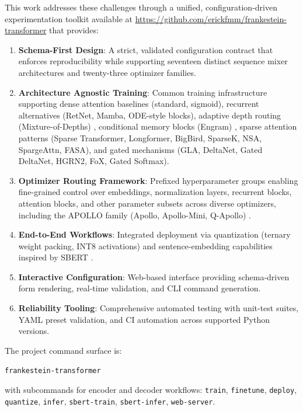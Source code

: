 \documentclass[11pt,a4paper]{article}
\begin{document}
This work addresses these challenges through a unified, configuration-driven experimentation toolkit available at \url{https://github.com/erickfmm/frankestein-transformer} that provides:
\begin{enumerate}[leftmargin=*]
    \item \textbf{Schema-First Design}: A strict, validated configuration contract that enforces reproducibility while supporting seventeen distinct sequence mixer architectures and twenty-three optimizer families.
    \item \textbf{Architecture Agnostic Training}: Common training infrastructure supporting dense attention baselines (standard, sigmoid), recurrent alternatives (RetNet, Mamba, ODE-style blocks), adaptive depth routing (Mixture-of-Depths) \citep{zhu2026mixtureofdepthsattention}, conditional memory blocks (Engram) \citep{cheng2026conditionalmemoryscalablelookup}, sparse attention patterns (Sparse Transformer, Longformer, BigBird, SparseK, NSA, SpargeAttn, FASA), and gated mechanisms (GLA, DeltaNet, Gated DeltaNet, HGRN2, FoX, Gated Softmax).
    \item \textbf{Optimizer Routing Framework}: Prefixed hyperparameter groups enabling fine-grained control over embeddings, normalization layers, recurrent blocks, attention blocks, and other parameter subsets across diverse optimizers, including the APOLLO family (Apollo, Apollo-Mini, Q-Apollo) \citep{zhu2025apollosgdlikememoryadamwlevel}.
    \item \textbf{End-to-End Workflows}: Integrated deployment via quantization (ternary weight packing, INT8 activations) and sentence-embedding capabilities inspired by SBERT \citep{reimers_sentence-bert_2019}.
    \item \textbf{Interactive Configuration}: Web-based interface providing schema-driven form rendering, real-time validation, and CLI command generation.
    \item \textbf{Reliability Tooling}: Comprehensive automated testing with unit-test suites, YAML preset validation, and CI automation across supported Python versions.
\end{enumerate}

The project command surface is:
\begin{center}
\texttt{frankestein-transformer}
\end{center}
with subcommands for encoder and decoder workflows:
\texttt{train}, \texttt{finetune}, \texttt{deploy}, \texttt{quantize}, \texttt{infer}, \texttt{sbert-train}, \texttt{sbert-infer}, \texttt{web-server}.
\end{document}
